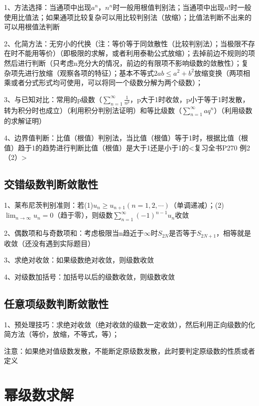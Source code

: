 1、方法选择：当通项中出现$a^n$，$n^n$时一般用根值判别法；当通项中出现$n!$时一般使用比值法；如果通项比较复杂可以用比较判别法（放缩）；比值法判断不出来的可以用根值法判断

2、化简方法：无穷小的代换（注：等价等于同敛散性（比较判别法）；当极限不存在时不能用等价）（即极限的求解，或者利用泰勒公式放缩）；去掉前边不规则的项然后进行判断（只考虑n充分大的情况，前边的有限项不影响级数的敛散性）；复杂项先进行放缩（观察各项的特征）；基本不等式$2ab \le a^2 + b^2$放缩变换（两项相乘或者分式形式均可使用，可以将同一个级数分解为两个级数）；

3、与已知对比：常用的p级数（$\sum_{n=1}^{\infty} \frac 1{n^p}$，p大于1时收敛，p小于等于1时发散，转为积分时也成立）（利用积分判别法证明）和等比级数（$\sum_{n=1}^{\infty} a{q^n}$）（利用级数的求解证明）

4、边界值判断：比值（根值）判别法，当比值（根值）等于1时，根据比值（根值）趋于1的趋势进行判断比值（根值）是大于1还是小于1的<复习全书P270 例2 （2）>



\subsection{交错级数判断敛散性}

1、莱布尼茨判别准则：若(1)$u_{n} \geqslant u_{n+1}(n=1,2, \cdots)$（单调递减）；(2)$\lim_{n \rightarrow \infty} u_{n}=0$（趋于零），则级数$\sum_{n=1}^{\infty}(-1)^{n-1} u_{n}$收敛

2、偶数项和与奇数项和：考虑极限当n趋近于$\infty$时$S_{2N}$是否等于$S_{2N+1}$，相等就是收敛（还没有遇到实际题目）

3、求绝对收敛：如果级数绝对收敛，则级数收敛

4、对级数加括号：加括号以后的级数收敛，则级数收敛



\subsection{任意项级数判断敛散性}

1、预处理技巧：求绝对收敛（绝对收敛的级数一定收敛），然后利用正向级数的化简方法（等价，放缩，不等式，等）；

注意：如果绝对值级数发散，不能断定原级数发散，此时要判定原级数的性质或者定义

\section{幂级数求解}



